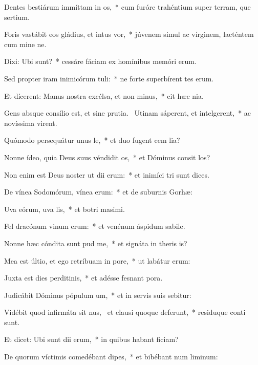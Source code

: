 \item Dentes bestiárum immíttam in os,~* cum furóre trahéntium super terram, que sertium.
\item Foris vastábit eos gládius, et intus vor,~* júvenem simul ac vírginem, lacténtem cum mine ne.
\item Dixi: Ubi sunt?~* cessáre fáciam ex homínibus memóri erum.
\item Sed propter iram inimicórum tuli:~* ne forte superbírent tes erum.
\item Et dícerent: Manus nostra excélsa, et non minus,~* cit hæc nia.
\item Gens absque consílio est, et sine prutia.~\pscross{} Utinam sáperent, et intelgerent,~* ac novíssima virent.
\item Quómodo persequátur unus le,~* et duo fugent cem lia?
\item Nonne ídeo, quia Deus suus véndidit os,~* et Dóminus consit los?
\item Non enim est Deus noster ut dii erum:~* et inimíci tri sunt dices.
\item De vínea Sodomórum, vínea erum:~* et de suburnis Gorhæ:
\item Uva eórum, uva lis,~* et botri masimi.
\item Fel dracónum vinum erum:~* et venénum áspidum sabile.
\item Nonne hæc cóndita sunt pud me,~* et signáta in theris is?
\item Mea est últio, et ego retríbuam in pore,~* ut labátur  erum:
\item Juxta est dies perditinis,~* et adésse fesnant pora.
\item Judicábit Dóminus pópulum um,~* et in servis suis sebitur:
\item Vidébit quod infirmáta sit nus,~\pscross{} et clausi quoque deferunt,~* residuque conti sunt.
\item Et dicet: Ubi sunt dii erum,~* in quibus habant ficiam?
\item De quorum víctimis comedébant dipes,~* et bibébant num liminum:

